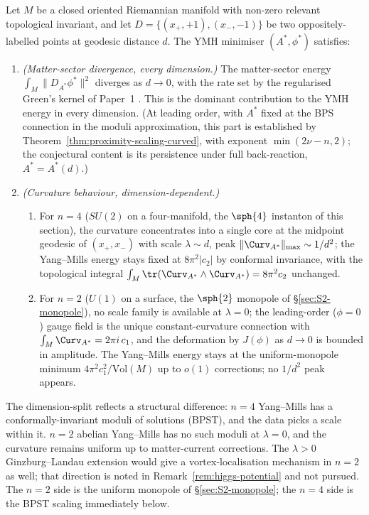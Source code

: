 \begin{conjecture}\label{conj:proximity-curvature}
Let $M$ be a closed oriented Riemannian manifold with non-zero
relevant topological invariant, and let $D=\{(x_+,+1),(x_-,-1)\}$ be
two oppositely-labelled points at geodesic distance $d$. The YMH
minimiser $(A^*,\phi^*)$ satisfies:
\begin{enumerate}[label=(\roman*),leftmargin=2em]
\item \emph{(Matter-sector divergence, every dimension.)} The
matter-sector energy $\int_M\|D_{A^*}\phi^*\|^2$ diverges as
$d\to 0$, with the rate set by the regularised Green's kernel of
Paper~1 \cite[Theorem~13.3]{Vasii2026Paper1}. This is the dominant
contribution to the YMH energy in every dimension. (At leading order,
with $A^*$ fixed at the BPS connection in the moduli approximation,
this part is established by
Theorem~\ref{thm:proximity-scaling-curved}, with exponent
$\min(2\nu-n,2)$; the conjectural content is its persistence under
full back-reaction, $A^*=A^*(d)$.)
\item \emph{(Curvature behaviour, dimension-dependent.)}
\begin{enumerate}[label=(\alph*),leftmargin=2em]
\item For $n=4$ ($SU(2)$ on a four-manifold, the $\sph{4}$ instanton
of this section), the curvature concentrates into a single core at
the midpoint geodesic of $(x_+,x_-)$ with scale $\lambda\sim d$,
peak $\|\Curv_{A^*}\|_{\max}\sim 1/d^2$; the Yang--Mills energy stays
fixed at $8\pi^2|c_2|$ by conformal invariance, with the topological
integral $\int_M\tr(\Curv_{A^*}\wedge\Curv_{A^*})=8\pi^2 c_2$
unchanged.
\item For $n=2$ ($U(1)$ on a surface, the $\sph{2}$ monopole of
\S\ref{sec:S2-monopole}), no scale family is available at
$\lambda=0$; the leading-order ($\phi=0$) gauge field is the unique
constant-curvature connection with
$\int_M\Curv_{A^*}=2\pi i\,c_1$, and the deformation by $J(\phi)$
as $d\to 0$ is bounded in amplitude. The Yang--Mills energy stays
at the uniform-monopole minimum $4\pi^2 c_1^2/\mathrm{Vol}(M)$ up to
$o(1)$ corrections; no $1/d^2$ peak appears.
\end{enumerate}
\end{enumerate}
\end{conjecture}

The dimension-split reflects a structural difference: $n=4$
Yang--Mills has a conformally-invariant moduli of solutions
(BPST), and the data picks a scale within it. $n=2$ abelian
Yang--Mills has no such moduli at $\lambda=0$, and the curvature
remains uniform up to matter-current corrections. The $\lambda>0$
Ginzburg--Landau extension would give a vortex-localisation
mechanism in $n=2$ as well; that direction is noted in
Remark~\ref{rem:higgs-potential} and not pursued. The $n=2$ side is
the uniform monopole of \S\ref{sec:S2-monopole}; the $n=4$ side is
the BPST scaling immediately below.

